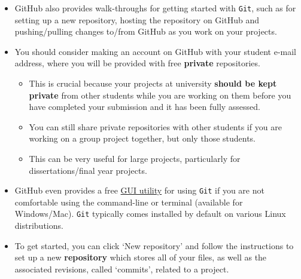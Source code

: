 \documentclass[11pt]{report}
\begin{document}
\begin{enumerate}
\begin{itemize}
		\item GitHub also provides walk-throughs for getting started with {\tt Git}, such as for setting up a new repository, hosting the repository on GitHub and pushing/pulling changes to/from GitHub as you work on your projects.

		\item You should consider making an account on GitHub with your student e-mail address, where you will be provided with free \textbf{private} repositories.
		\begin{itemize}
			\item This is crucial because your projects at university \textbf{should be kept private} from other students while you are working on them before you have completed your submission and it has been fully assessed.
			\item You can still share private repositories with other students if you are working on a group project together, but only those students.
			\item This can be very useful for large projects, particularly for dissertations/final year projects.
		\end{itemize}

		\item GitHub even provides a free \href{https://desktop.github.com/}{GUI utility} for using {\tt Git} if you are not comfortable using the command-line or terminal (available for Windows/Mac). {\tt Git} typically comes installed by default on various Linux distributions.

		\item To get started, you can click `New repository' and follow the instructions to set up a new \textbf{repository} which stores all of your files, as well as the associated revisions, called `commits', related to a project.
	\end{itemize}
\end{enumerate}
\end{document}
